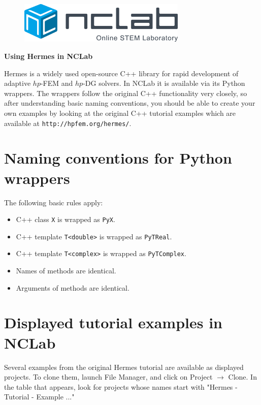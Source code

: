 \documentclass{article}
\begin{document}
\large

\vbox{}
\begin{figure}[!ht]
\includegraphics[width=8cm]{logo.png}
\vspace{4mm}
\end{figure}

\centerline{\huge \bf Using Hermes in NCLab}
\vspace{6mm}
\noindent
Hermes is a widely used open-source C++ library for rapid development of adaptive $hp$-FEM and $hp$-DG solvers.
In NCLab it is available via its Python wrappers. The wrappers follow the original C++ 
functionality very closely, so after understanding basic naming conventions, you should
be able to create your own examples by looking at the original C++ tutorial examples
which are available at {\tt http://hpfem.org/hermes/}.

\section*{Naming conventions for Python wrappers}

The following basic rules apply:

\begin{itemize}
\item C++ class {\tt X} is wrapped as {\tt PyX}. 
\item C++ template {\tt T<double>} is wrapped as {\tt PyTReal}.  
\item C++ template {\tt T<complex>} is wrapped as {\tt PyTComplex}.  
\item Names of methods are identical. 
\item Arguments of methods are identical. 
\end{itemize}

\section*{Displayed tutorial examples in NCLab}

Several examples from the original Hermes tutorial are
available as displayed projects. To clone them, launch
File Manager, and click on Project $\rightarrow$ Clone.
In the table that appears, look for projects whose names 
start with "Hermes - Tutorial - Example ..."
\end{document}
